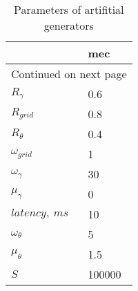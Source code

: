\begin{longtable}{ll}
\caption{Parameters of artifitial generators}\label{ArtifitialGridCell_parameters}\\
\toprule
{} &     mec \\
\midrule
\endhead
\midrule
\multicolumn{2}{r}{{Continued on next page}} \\
\midrule
\endfoot

\bottomrule
\endlastfoot
$R_{\gamma}$     &     0.6 \\
$R_{grid}$      &     0.8 \\
$R_{\theta}$     &     0.4 \\
$\omega_{grid}$ &       1 \\
$\omega_{\gamma}$ &      30 \\
$\mu_{\gamma}$    &       0 \\
$latency,\ ms$    &      10 \\
$\omega_{\theta}$  &       5 \\
$\mu_{\theta}$     &     1.5 \\
$S$ &  100000 \\
\end{longtable}

